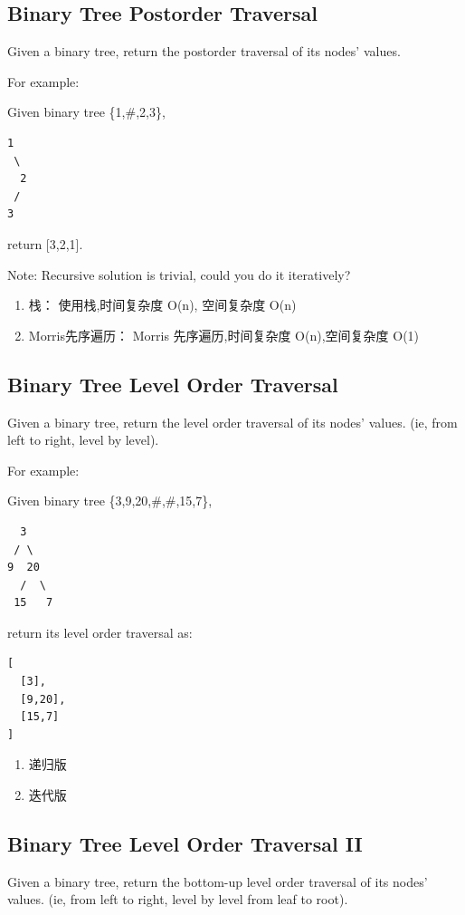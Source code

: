 \documentclass[12pt]{book}
\begin{document}
\subsection{Binary Tree Postorder Traversal}
\label{sec-4-1-3}
Given a binary tree, return the postorder traversal of its nodes' values.

For example:

Given binary tree \{1,\#,2,3\},
\lstset{language=java,label= ,caption= ,numbers=none}
\begin{lstlisting}
1
 \
  2
 /
3
\end{lstlisting}

return [3,2,1].

Note: Recursive solution is trivial, could you do it iteratively?
\begin{enumerate}
\item 栈： 使用栈,时间复杂度 O(n), 空间复杂度 O(n)
\label{sec-4-1-3-1}
\item Morris先序遍历： Morris 先序遍历,时间复杂度 O(n),空间复杂度 O(1)
\label{sec-4-1-3-2}
\end{enumerate}


\subsection{Binary Tree Level Order Traversal}
\label{sec-4-1-4}
Given a binary tree, return the level order traversal of its nodes' values. (ie, from left to right, level by level).

For example:

Given binary tree \{3,9,20,\#,\#,15,7\},
\lstset{language=java,label= ,caption= ,numbers=none}
\begin{lstlisting}
  3
 / \
9  20
  /  \
 15   7
\end{lstlisting}
return its level order traversal as:
\lstset{language=java,label= ,caption= ,numbers=none}
\begin{lstlisting}
[
  [3],
  [9,20],
  [15,7]
]
\end{lstlisting}
\begin{enumerate}
\item 递归版
\label{sec-4-1-4-1}
\item 迭代版
\label{sec-4-1-4-2}
\end{enumerate}

\subsection{Binary Tree Level Order Traversal II}
\label{sec-4-1-5}
Given a binary tree, return the bottom-up level order traversal of its nodes' values. (ie, from left to right, level by level from leaf to root).
\end{document}
